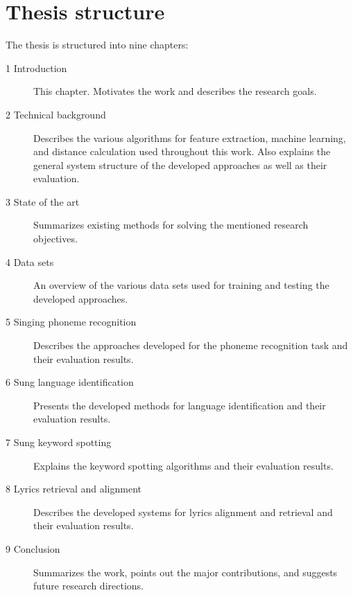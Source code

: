 \section{Thesis structure}
The thesis is structured into nine chapters:
\begin{description}
\item[1 Introduction] This chapter. Motivates the work and describes the research goals.
\item[2 Technical background] Describes the various algorithms for feature extraction, machine learning, and distance calculation used throughout this work. Also explains the general system structure of the developed approaches as well as their evaluation.
\item[3 State of the art] Summarizes existing methods for solving the mentioned research objectives.
\item[4 Data sets] An overview of the various data sets used for training and testing the developed approaches.
\item[5 Singing phoneme recognition] Describes the approaches developed for the phoneme recognition task and their evaluation results.
\item[6 Sung language identification] Presents the developed methods for language identification and their evaluation results.
\item[7 Sung keyword spotting] Explains the keyword spotting algorithms and their evaluation results.
\item[8 Lyrics retrieval and alignment] Describes the developed systems for lyrics alignment and retrieval and their evaluation results.
\item[9 Conclusion] Summarizes the work, points out the major contributions, and suggests future research directions.
\end{description}



